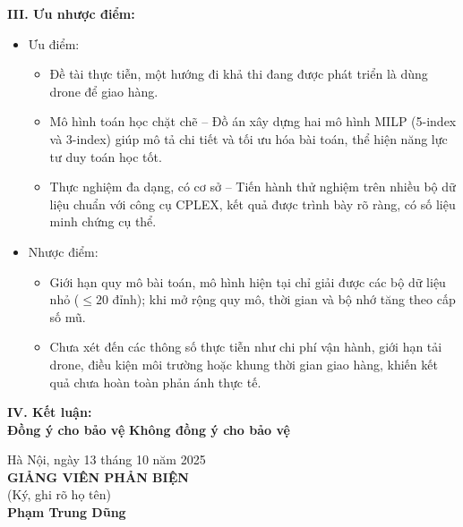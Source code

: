 \vspace{0.3cm}
\noindent\textbf{III. Ưu nhược điểm:}

\begin{itemize}

\item Ưu điểm:
    \begin{itemize}
        \item Đề tài thực tiễn, một hướng đi khả thi đang được phát triển là dùng drone để giao hàng.
        \item Mô hình toán học chặt chẽ – Đồ án xây dựng hai mô hình MILP (5-index và 3-index) giúp mô tả chi tiết và tối ưu hóa bài toán, thể hiện năng lực tư duy toán học tốt.
        \item Thực nghiệm đa dạng, có cơ sở – Tiến hành thử nghiệm trên nhiều bộ dữ liệu chuẩn với công cụ CPLEX, kết quả được trình bày rõ ràng, có số liệu minh chứng cụ thể.
    \end{itemize}

\item Nhược điểm:
    \begin{itemize}
        \item Giới hạn quy mô bài toán, mô hình hiện tại chỉ giải được các bộ dữ liệu nhỏ ($\leq 20$ đỉnh); khi mở rộng quy mô, thời gian và bộ nhớ tăng theo cấp số mũ.
        \item Chưa xét đến các thông số thực tiễn như chi phí vận hành, giới hạn tải drone, điều kiện môi trường hoặc khung thời gian giao hàng, khiến kết quả chưa hoàn toàn phản ánh thực tế.
    \end{itemize}
\end{itemize}


\noindent\textbf{IV. Kết luận:}\\[0.2cm]
 \textbf{Đồng ý cho bảo vệ} \hspace{2.5cm}  \textbf{Không đồng ý cho bảo vệ}

\vspace{0.3cm}
\noindent
\begin{minipage}[t]{0.48\textwidth}
\end{minipage}
\hfill
\begin{minipage}[t]{0.48\textwidth}
    \begin{center}
        Hà Nội, ngày 13 tháng 10 năm 2025\\[0.2cm]
        \textbf{GIẢNG VIÊN PHẢN BIỆN}\\[0.2cm]
        (Ký, ghi rõ họ tên)\\[1.2cm]
        \textbf{Phạm Trung Dũng}
    \end{center}
\end{minipage}